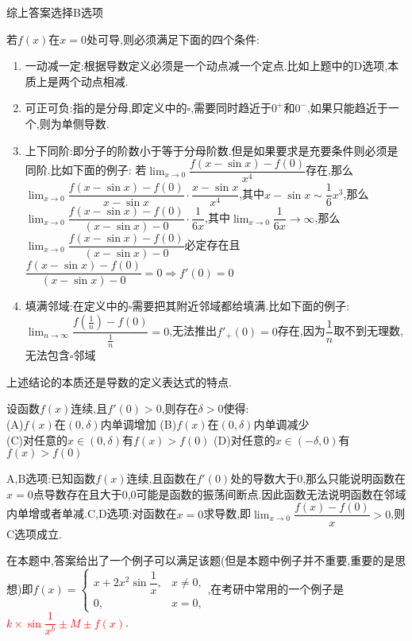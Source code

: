 \documentclass[8pt a4paper, oneside, UTF8]{ctexbook}  %
\begin{document}
\begin{sloppypar}
\begin{solution}
        综上答案选择B选项
    \end{solution}
    \begin{conclusion}{若$f(x)$在$x=0$处可导,则必须满足下面的四个条件:}{}
        \begin{enumerate}
            \item 一动减一定:根据导数定义必须是一个动点减一个定点.比如上题中的D选项,本质上是两个动点相减.
            \item 可正可负:指的是分母,即定义中的$\square$,需要同时趋近于$0^+$和$0^-$,如果只能趋近于一个,则为单侧导数.
            \item 上下同阶:即分子的阶数小于等于分母阶数.但是如果要求是充要条件则必须是同阶.比如下面的例子:
                  若$\lim_{x\to 0}\dfrac{f(x-\sin x)-f(0)}{x^4}$存在,那么$\lim_{x\to 0}\dfrac{f(x-\sin x)-f(0)}{x-\sin x}\cdot \dfrac{x - \sin x}{x^4}$,其中$ x - \sin x \sim \dfrac{1}{6}x^3$,那么$\lim_{x\to 0}\dfrac{f(x-\sin x)-f(0)}{(x-\sin x)-0}\cdot \dfrac{1}{6x}$,其中$\lim_{x\to 0} \dfrac{1}{6x} \to \infty$,那么$\lim_{x\to 0}\dfrac{f(x-\sin x)-f(0)}{(x-\sin x)-0}$必定存在且$\dfrac{f(x-\sin x)-f(0)}{(x-\sin x)-0}=0 \Rightarrow f'(0)=0$
            \item 填满邻域:在定义中的$\square$需要把其附近邻域都给填满.比如下面的例子:$\lim_{n\to \infty}\dfrac{f(\frac{1}{n})-f(0)}{\frac{1}{n}}=0$,无法推出$f'_+(0)=0$存在,因为$\dfrac{1}{n}$取不到无理数,无法包含$\square$邻域
        \end{enumerate}
        上述结论的本质还是导数的定义表达式的特点.
    \end{conclusion}
    \begin{problem}
    设函数$f(x)$连续,且$f'(0)>0$,则存在$\delta >0 $使得:\\
    (A)$f(x)$在$(0,\delta)$内单调增加 \quad (B)$f(x)$在$(0,\delta)$内单调减少\\
    (C)对任意的$x \in (0,\delta)$有$f(x)>f(0)$ \quad    (D)对任意的$x\in (-\delta,0)$有$f(x)>f(0)$
    \end{problem}
    \begin{solution}
        A,B选项:已知函数$f(x)$连续,且函数在$f'(0)$处的导数大于0,那么只能说明函数在$x=0$点导数存在且大于0,0可能是函数的振荡间断点.因此函数无法说明函数在邻域内单增或者单减.C,D选项:对函数在$x=0$求导数,即$\lim_{x\to 0} \dfrac{f(x)-f(0)}{x}>0$,则C选项成立.
    \end{solution}
    \begin{note}
        在本题中,答案给出了一个例子可以满足该题(但是本题中例子并不重要,重要的是思想)即$f\left(x\right)=\left\{\begin{matrix}x+2x^{2}\sin\dfrac{1}{x},&x\neq0,\\0,&x=0,\end{matrix}\right.$,在考研中常用的一个例子是\textcolor{red}{$k \times \sin \dfrac{1}{x^b}\pm M \pm f(x)$}.

\end{note}
\end{sloppypar}
\end{document}
